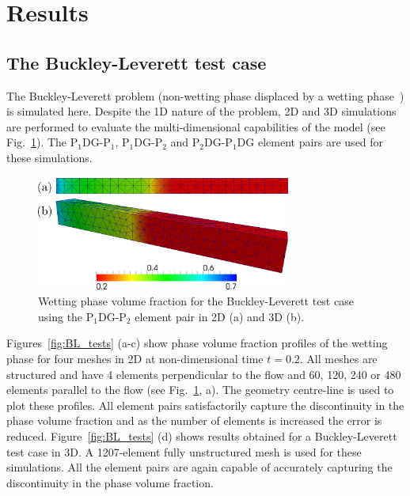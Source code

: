 \documentclass[times]{fldauth}
\newcommand{\PN}[2][error]{P$_{#1}$DG-P$_{#2}$}
\begin{document}
\section{Results}\label{res}



\subsection{The Buckley-Leverett test case}\label{classical_BL}

The Buckley-Leverett problem (non-wetting phase displaced by a wetting phase~\cite{buckley1942}) is simulated here. Despite the 1D nature of the problem, 2D and 3D simulations are performed to evaluate the multi-dimensional capabilities of the model (see Fig.~\ref{fig:maps2d_3d}). The \PN[1]{1}, \PN[1]{2} and \PN[2]{1}DG element pairs are used for these simulations.

\begin{figure}[h!]
  \begin{center}
    \includegraphics[width=0.75\textwidth]{BL_3D_merged}
    \caption{Wetting phase volume fraction for the Buckley-Leverett
      test case using the \PN[1]{2} element pair in 2D (a) and 3D
      (b). \label{fig:maps2d_3d}}
  \end{center}
\end{figure}

Figures~\ref{fig:BL_tests} (a-c) show phase volume fraction profiles of the wetting phase for four meshes in 2D at non-dimensional time $t=0.2$. All meshes are structured and have 4 elements perpendicular to the flow and 60, 120, 240 or 480 elements parallel to the flow (see Fig.~\ref{fig:maps2d_3d}, a). The geometry centre-line is used to plot these profiles. All element pairs satisfactorily capture the discontinuity in the phase volume fraction and as the number of elements is increased the error is reduced. Figure~\ref{fig:BL_tests} (d) shows results obtained for a Buckley-Leverett test case in 3D. A 1207-element fully unstructured mesh is used for these simulations.%
All the element pairs are again capable of accurately capturing the discontinuity in the phase volume fraction.
\end{document}
